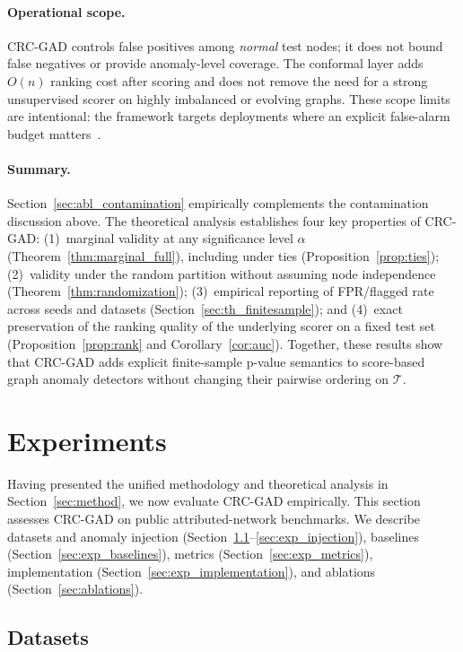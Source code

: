 \documentclass[a4paper]{cas-dc}
\theoremstyle{definition}
\begin{document}
\paragraph{Operational scope.}
CRC-GAD controls false positives among \emph{normal} test nodes; it does not bound false negatives or provide anomaly-level coverage.  The conformal layer adds $O(n)$ ranking cost after scoring and does not remove the need for a strong unsupervised scorer on highly imbalanced or evolving graphs.  These scope limits are intentional: the framework targets deployments where an explicit false-alarm budget matters~\cite{bates2023testing,ma2021comprehensive}.
\paragraph{Summary.}
Section~\ref{sec:abl_contamination} empirically complements the contamination discussion above.
The theoretical analysis establishes four key properties of CRC-GAD: (1)~marginal validity at any significance level $\alpha$ (Theorem~\ref{thm:marginal_full}), including under ties (Proposition~\ref{prop:ties}); (2)~validity under the random partition without assuming node independence (Theorem~\ref{thm:randomization}); (3)~empirical reporting of FPR/flagged rate across seeds and datasets (Section~\ref{sec:th_finitesample}); and (4)~exact preservation of the ranking quality of the underlying scorer on a fixed test set (Proposition~\ref{prop:rank} and Corollary~\ref{cor:auc}).  Together, these results show that CRC-GAD adds explicit finite-sample p-value semantics to score-based graph anomaly detectors without changing their pairwise ordering on $\mathcal{T}$.

\section{Experiments}
\label{sec:experiments}

Having presented the unified methodology and theoretical analysis in Section~\ref{sec:method}, we now evaluate CRC-GAD empirically. This section assesses CRC-GAD on public attributed-network benchmarks.
We describe datasets and anomaly injection (Section~\ref{sec:exp_datasets}--\ref{sec:exp_injection}), baselines (Section~\ref{sec:exp_baselines}), metrics (Section~\ref{sec:exp_metrics}), implementation (Section~\ref{sec:exp_implementation}), and ablations (Section~\ref{sec:ablations}).


\subsection{Datasets}
\label{sec:exp_datasets}
\end{document}
